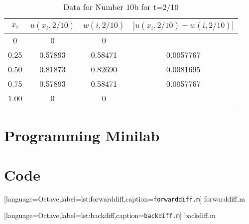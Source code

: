 \documentclass[12pt]{article}
\begin{document}
\begin{table}[H]
  \centering
  \begin{tabular}[p]{cccc}
    \hline
    $x_i$ & $u(x_i,2/10)$ & $w(i,2/10)$ & $|u(x_i,2/10)-w(i,2/10)|$ \\
    \hline
    0 & 0 & 0 & \\
    0.25 & 0.57893 & 0.58471 & 0.0057767 \\
    0.50 & 0.81873 & 0.82690 & 0.0081695 \\
    0.75 & 0.57893 & 0.58471 & 0.0057767 \\
    1.00 & 0 & 0 & \\
    \hline
  \end{tabular}
  \caption{Data for Number 10b for t=2/10}
  \label{tab:10b_2}
\end{table}

\section{Programming Minilab}

\section{Code}

[language=Octave,label=lst:forwarddiff,caption=\texttt{forwarddiff.m}]
{forwarddiff.m}


[language=Octave,label=lst:backdiff,caption=\texttt{backdiff.m}]
{backdiff.m}
\end{document}
